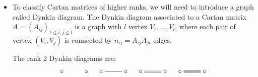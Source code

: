 \begin{itemize}
For example, the Rank 1 and 2 Cartan matrices are:
\begin{equation}
    \begin{split}
        &\quad (2)\\
    &\begin{pmatrix}2&0\\0&2\end{pmatrix}\\
    &\begin{pmatrix}2&-1\\-1&2\end{pmatrix}\\
    &\begin{pmatrix}2&-1\\-2&2\end{pmatrix}\;\begin{pmatrix}2&-2\\-1&2\end{pmatrix}\\
    &\begin{pmatrix}2&-1\\-3&2\end{pmatrix}\;\begin{pmatrix}2&-3\\-1&2\end{pmatrix}
    \end{split}
\end{equation}
\item To classify Cartan matrices of higher ranks, we will need to introduce a graph called Dynkin diagram. The 
Dynkin diagram associated to a Cartan matrix $A=(A_{ij})_{1\leq i,j\leq l}$ is a graph with $l$ vertex $V_1,\dots, V_l$, 
where each pair of vertex $(V_i,V_j)$ is connected by $n_{ij}=A_{ij}A_{ji}$ edges.\par 
\begin{dang}
    \begin{remark}
        The rank 2 Dynkin diagrams are:
\[
\xymatrix{
   \circ &\circ
}\quad
\xymatrix{
    \circ \ar@{-}[r]& \circ
}\quad
\xymatrix{
    \circ \ar@{-}@<0.2ex>[r]\ar@{-}@<-0.2ex>[r] &\circ 
}\quad
\xymatrix{
 \circ \ar@{-}@<0.3ex>[r]\ar@{-}[r]\ar@{-}@<-0.3ex>[r] & \circ
}
\]
    \end{remark}
\end{dang}


\end{itemize}
